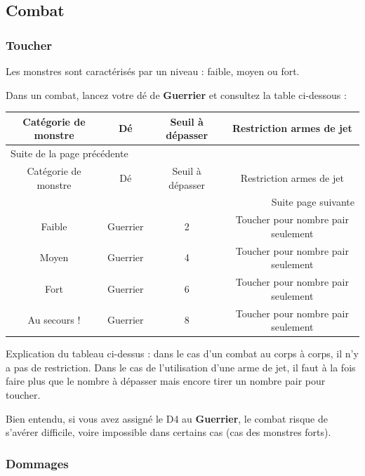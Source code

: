 \documentclass[a4paper, 11pt, twoside]{article}
\begin{document}
\subsection{Combat}
\label{sec:org459fcdc}
\subsubsection{Toucher}
\label{sec:org4570930}

Les monstres sont caractérisés par un niveau : faible, moyen ou fort.

Dans un combat, lancez votre dé de \textbf{Guerrier} et consultez la table ci-dessous :

\begin{longtable}{c|c|c|c}
Catégorie de monstre & Dé & Seuil à dépasser & Restriction armes de jet\\
\hline
\endfirsthead
\multicolumn{4}{l}{Suite de la page précédente} \\
\hline

Catégorie de monstre & Dé & Seuil à dépasser & Restriction armes de jet \\

\hline
\endhead
\hline\multicolumn{4}{r}{Suite page suivante} \\
\endfoot
\endlastfoot
\hline
Faible & Guerrier & 2 & Toucher pour nombre pair seulement\\
Moyen & Guerrier & 4 & Toucher pour nombre pair seulement\\
Fort & Guerrier & 6 & Toucher pour nombre pair seulement\\
Au secours ! & Guerrier & 8 & Toucher pour nombre pair seulement\\
\end{longtable}

Explication du tableau ci-dessus : dans le cas d'un combat au corps à corps, il n'y a pas de restriction. Dans le cas de l'utilisation d'une arme de jet, il faut à la fois faire plus que le nombre à dépasser mais encore tirer un nombre pair pour toucher. 

Bien entendu, si vous avez assigné le D4 au \textbf{Guerrier}, le combat risque de s'avérer difficile, voire impossible dans certains cas (cas des monstres forts).

\newpage

\subsubsection{Dommages}
\label{sec:org4710de9}
\end{document}
